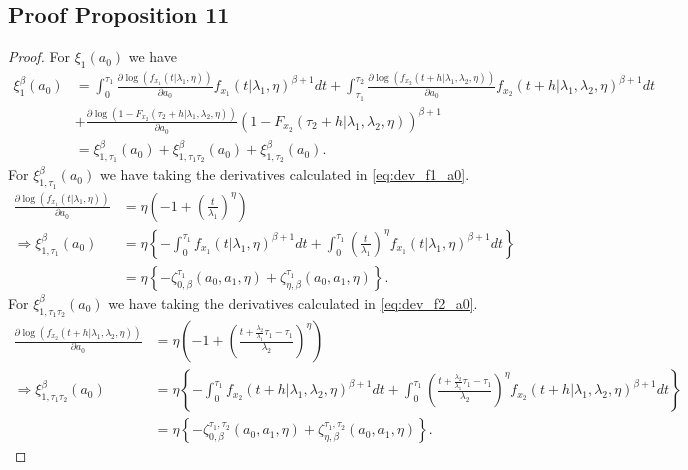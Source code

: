 \documentclass{article}
\begin{document}
\subsection{Proof Proposition 11}

\begin{proof}
For $\xi_1(a_0)$ we have
\begin{align*}
\xi_1^{\beta}(a_0)&=\int_{0}^{\tau_1}\frac{\partial \log\left(f_{x_1}(t|\lambda_1,\eta)\right)}{\partial a_0}f_{x_1}(t|\lambda_1,\eta)^{\beta+1}dt+\int_{\tau_1}^{\tau_2}\frac{\partial \log\left(f_{x_2}(t+h|\lambda_1,\lambda_2,\eta)\right)}{\partial a_0} f_{x_2}(t+h|\lambda_1,\lambda_2,\eta)^{\beta+1}dt
\\
&+\frac{\partial \log\left(1-F_{x_2}(\tau_2+h|\lambda_1,\lambda_2,\eta)\right)}{\partial a_0}\left(1-F_{x_2}(\tau_2+h|\lambda_1,\lambda_2,\eta)\right)^{\beta+1}
\\
&=\xi_{1,\tau_1}^{\beta}(a_0)+\xi_{1,\tau_1 \tau_2}^{\beta} (a_0)+ \xi_{1,\tau_2}^{\beta}(a_0).
\end{align*}
For $\xi_{1,\tau_1}^{\beta}(a_0)$ we have taking the derivatives calculated in \eqref{eq:dev_f1_a0}.
\begin{align*}
\frac{\partial \log\left(f_{x_1}(t|\lambda_1,\eta)\right)}{\partial a_0}&=\eta\left(-1+\left(\frac{t}{\lambda_1}\right)^{\eta}\right)
\\
\Rightarrow  \xi_{1,\tau_1}^{\beta}(a_0)&=\eta\left\{-\int_{0}^{\tau_1}f_{x_1}(t|\lambda_1,\eta)^{\beta+1}dt+\int_{0}^{\tau_1}\left(\frac{t}{\lambda_1}\right)^{\eta}f_{x_1}(t|\lambda_1,\eta)^{\beta+1}dt \right\}
\\
&=\eta\left\{-\zeta_{0,\beta}^{\tau_1}(a_0,a_1,\eta)+\zeta_{\eta,\beta}^{\tau_1}(a_0,a_1,\eta)\right\}.
\end{align*}
For $\xi_{1,\tau_1\tau_2}^{\beta}(a_0)$ we have taking the derivatives calculated in \eqref{eq:dev_f2_a0}.
\begin{align*}
\frac{\partial \log\left(f_{x_2}(t+h|\lambda_1,\lambda_2,\eta)\right)}{\partial a_0}&=\eta\left(-1+\left(\frac{t+\frac{\lambda_2}{\lambda_1}\tau_1-\tau_1}{\lambda_2}\right)^{\eta}\right)
\\
\Rightarrow  \xi_{1,\tau_1\tau_2}^{\beta}(a_0)&=\eta\left\{-\int_{0}^{\tau_1}f_{x_2}(t+h|\lambda_1,\lambda_2,\eta)^{\beta+1}dt+\int_{0}^{\tau_1}\left(\frac{t+\frac{\lambda_2}{\lambda_1}\tau_1-\tau_1}{\lambda_2}\right)^{\eta}f_{x_2}(t+h|\lambda_1,\lambda_2,\eta)^{\beta+1}dt \right\}
\\
&=\eta\left\{-\zeta_{0,\beta}^{\tau_1,\tau_2}(a_0,a_1,\eta)+\zeta_{\eta,\beta}^{\tau_1,\tau_2}(a_0,a_1,\eta)\right\}.

\end{align*}
\end{proof}
\end{document}
